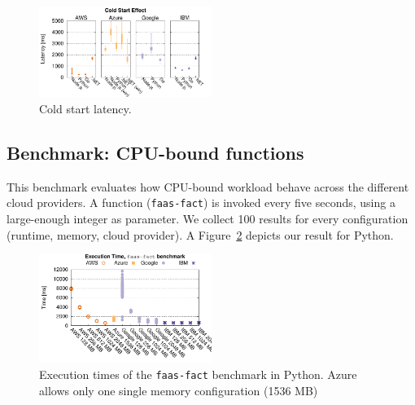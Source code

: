 \begin{figure}[!t]
\centering
\includegraphics[width=0.5\textwidth]{bilder/cold_start/coldstart_whisker.pdf}
\caption{Cold start latency.}
\label{fig:coldstart_plot}
\end{figure}



\subsection{Benchmark: CPU-bound functions}
\label{sec:general_test}
This benchmark evaluates how CPU-bound workload behave across the different cloud providers.
A function (\texttt{faas-fact}) is invoked every five seconds, using a large-enough integer as parameter. 
We collect 100 results for every configuration (runtime, memory, cloud provider).
A%
Figure~\ref{fig:general_python_plot} depicts our result for Python.

\begin{figure}[!t]
\centering
\includegraphics[width=0.5\textwidth, trim={0 40 0 0}]{bilder/general_python/cpufact.pdf}
\caption{Execution times of the \texttt{faas-fact} benchmark in Python. Azure allows only one single memory configuration (1536 MB)}
\label{fig:general_python_plot}

\end{figure}

